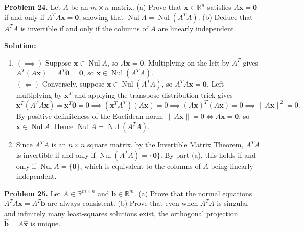\documentclass[11pt, letterpaper]{article}
\theoremstyle{definition}
\theoremstyle{remark}
\begin{document}
\textbf{Problem 24.} Let $A$ be an $m \times n$ matrix. (a) Prove that $\mathbf{x} \in \mathbb{R}^n$ satisfies $A\mathbf{x} = \mathbf{0}$ if and only if $A^T A \mathbf{x} = \mathbf{0}$, showing that $\operatorname{Nul} A = \operatorname{Nul}(A^T A)$. (b) Deduce that $A^T A$ is invertible if and only if the columns of $A$ are linearly independent.

\textbf{Solution:}
\begin{enumerate}[label=(\alph*)]
    \item $(\implies)$ Suppose $\mathbf{x} \in \operatorname{Nul} A$, so $A\mathbf{x} = \mathbf{0}$. Multiplying on the left by $A^T$ gives $A^T(A\mathbf{x}) = A^T\mathbf{0} = \mathbf{0}$, so $\mathbf{x} \in \operatorname{Nul}(A^T A)$.\\
    $(\Longleftarrow)$ Conversely, suppose $\mathbf{x} \in \operatorname{Nul}(A^T A)$, so $A^T A \mathbf{x} = \mathbf{0}$. Left-multiplying by $\mathbf{x}^T$ and applying the transpose distribution trick gives
    \[
    \mathbf{x}^T(A^T A \mathbf{x}) = \mathbf{x}^T \mathbf{0} = 0 \implies (\mathbf{x}^T A^T)(A\mathbf{x}) = 0 \implies (A\mathbf{x})^T(A\mathbf{x}) = 0 \implies \|A\mathbf{x}\|^2 = 0.
    \]
    By positive definiteness of the Euclidean norm, $\|A\mathbf{x}\| = 0 \iff A\mathbf{x} = \mathbf{0}$, so $\mathbf{x} \in \operatorname{Nul} A$. Hence $\operatorname{Nul} A = \operatorname{Nul}(A^T A)$.
    \item Since $A^T A$ is an $n \times n$ square matrix, by the Invertible Matrix Theorem, $A^T A$ is invertible if and only if $\operatorname{Nul}(A^T A) = \{\mathbf{0}\}$. By part (a), this holds if and only if $\operatorname{Nul} A = \{\mathbf{0}\}$, which is equivalent to the columns of $A$ being linearly independent.
\end{enumerate}

\textbf{Problem 25.} Let $A \in \mathbb{R}^{m \times n}$ and $\mathbf{b} \in \mathbb{R}^m$. (a) Prove that the normal equations $A^T A \mathbf{x} = A^T \mathbf{b}$ are always consistent. (b) Prove that even when $A^T A$ is singular and infinitely many least-squares solutions exist, the orthogonal projection $\hat{\mathbf{b}} = A\hat{\mathbf{x}}$ is unique.
\end{document}
